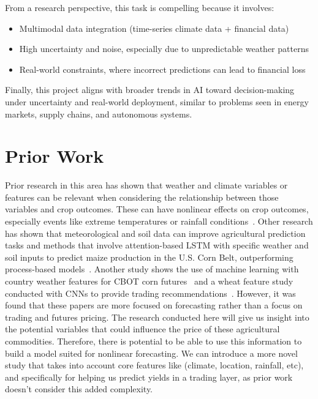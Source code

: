 \documentclass{article} %
\begin{document}
From a research perspective, this task is compelling because it involves:
\begin{itemize}
   \item Multimodal data integration (time-series climate data + financial data)
   \item High uncertainty and noise, especially due to unpredictable weather patterns
   \item Real-world constraints, where incorrect predictions can lead to financial loss
\end{itemize}

Finally, this project aligns with broader trends in AI toward decision-making under uncertainty and real-world deployment, similar to problems seen in energy markets, supply chains, and autonomous systems.


\section{Prior Work}
Prior research in this area has shown that weather and climate variables or features can be relevant when considering the relationship between those variables and crop outcomes. These can have nonlinear effects on crop outcomes, especially events like extreme temperatures or rainfall conditions~\cite{schlenker2009nonlinear}. Other research has shown that meteorological and soil data can improve agricultural prediction tasks and methods that involve attention-based LSTM with specific weather and soil inputs to predict maize production in the U.S. Corn Belt, outperforming process-based models~\cite{liu2022machine}. Another study shows the use of machine learning with country weather features for CBOT corn futures~\cite{singh2022estimating} and a wheat feature study conducted with CNNs to provide trading recommendations~\cite{thaker2024forecasting}. However, it was found that these papers are more focused on forecasting rather than a focus on trading and futures pricing. The research conducted here will give us insight into the potential variables that could influence the price of these agricultural commodities. Therefore, there is potential to be able to use this information to build a model suited for nonlinear forecasting. We can introduce a more novel study that takes into account core features like (climate, location, rainfall, etc), and specifically for helping us predict yields in a trading layer, as prior work doesn't consider this added complexity.
\end{document}
